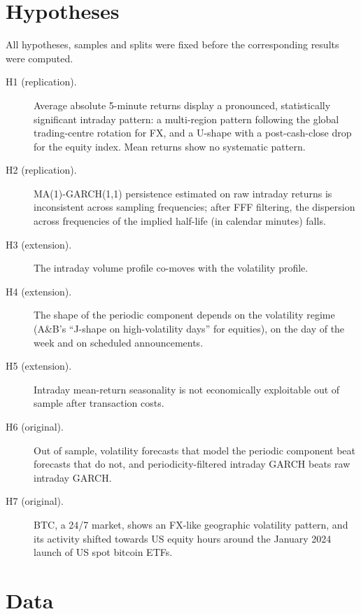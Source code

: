 \documentclass[11pt,a4paper]{article}
\begin{document}
\section{Hypotheses}
\label{sec:hyp}
All hypotheses, samples and splits were fixed before the corresponding results were computed.
\begin{description}
\item[H1 (replication).] Average absolute 5-minute returns display a pronounced, statistically significant intraday pattern: a multi-region pattern following the global trading-centre rotation for FX, and a U-shape with a post-cash-close drop for the equity index. Mean returns show no systematic pattern.
\item[H2 (replication).] MA(1)-GARCH(1,1) persistence estimated on raw intraday returns is inconsistent across sampling frequencies; after FFF filtering, the dispersion across frequencies of the implied half-life (in calendar minutes) falls.
\item[H3 (extension).] The intraday volume profile co-moves with the volatility profile.
\item[H4 (extension).] The shape of the periodic component depends on the volatility regime (A\&B's ``J-shape on high-volatility days'' for equities), on the day of the week and on scheduled announcements.
\item[H5 (extension).] Intraday mean-return seasonality is not economically exploitable out of sample after transaction costs.
\item[H6 (original).] Out of sample, volatility forecasts that model the periodic component beat forecasts that do not, and periodicity-filtered intraday GARCH beats raw intraday GARCH.
\item[H7 (original).] BTC, a 24/7 market, shows an FX-like geographic volatility pattern, and its activity shifted towards US equity hours around the January 2024 launch of US spot bitcoin ETFs.
\end{description}

\section{Data}
\label{sec:data}
\end{document}
